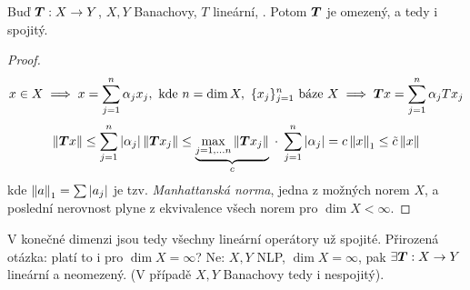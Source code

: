 \begin{theorem}
Buď $\boldsymbol{T}: X \to Y$, $X,Y$ Banachovy, $T$ lineární, . Potom $\boldsymbol{T}$ je omezený, a tedy i spojitý.
\end{theorem}
\begin{proof}
$$
    x \in X
    \implies
    x = \sum_{j=1}^n \alpha_j x_j, \text{ kde } n = \dim X, \text{ } \{ x_j \}_{j=1}^n \text{ báze } X
    \implies
    \boldsymbol{T}x = \sum_{j=1}^n \alpha_j T x_j
$$
$$
    \left\lVert\boldsymbol{T}x\right\rVert
    \leq
    \sum_{j=1}^n |\alpha_j| \left\lVert\boldsymbol{T}x_j\right\rVert
    \leq
    \underbrace{
        \underset{j=1,\dots n}{\max} \left\lVert\boldsymbol{T}x_j\right\rVert
    }_{c}
    \; \cdot \;
    \sum_{j=1}^n |\alpha_j|
    =
    c \left\lVert x\right\rVert_1
    \leq
    \Tilde{c} \left\lVert x\right\rVert
$$
kde $\left\lVert a\right\rVert_1 = \sum |a_j|$ je tzv. \textit{Manhattanská norma}, jedna z možných norem $X$, a poslední nerovnost plyne z ekvivalence všech norem pro $\dim X < \infty$.
\end{proof}

\begin{remark}
V konečné dimenzi jsou tedy všechny lineární operátory už spojité. Přirozená otázka: platí to i pro $\dim X = \infty$? Ne: $X, Y$ NLP, $\dim X = \infty$, pak $\exists \boldsymbol{T}: X \to Y$ lineární a neomezený. (V případě $X,Y$ Banachovy tedy i nespojitý).
\end{remark}

